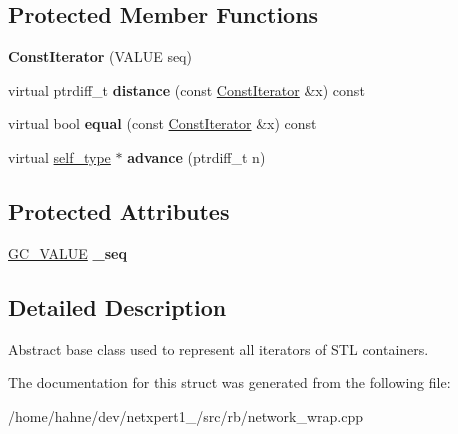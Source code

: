 \subsection*{Protected Member Functions}
\begin{DoxyCompactItemize}
\item 
{\bfseries Const\+Iterator} (V\+A\+L\+UE seq)\hypertarget{structswig_1_1ConstIterator_ae9c2d6b329f8a4b0096871fffa76e260}{}\label{structswig_1_1ConstIterator_ae9c2d6b329f8a4b0096871fffa76e260}

\item 
virtual ptrdiff\+\_\+t {\bfseries distance} (const \hyperlink{structswig_1_1ConstIterator}{Const\+Iterator} \&x) const \hypertarget{structswig_1_1ConstIterator_a34e525a9258ebde3d951bad65e06dc5e}{}\label{structswig_1_1ConstIterator_a34e525a9258ebde3d951bad65e06dc5e}

\item 
virtual bool {\bfseries equal} (const \hyperlink{structswig_1_1ConstIterator}{Const\+Iterator} \&x) const \hypertarget{structswig_1_1ConstIterator_a8d794aa8a430a9cf8d4b80c5e669dfc6}{}\label{structswig_1_1ConstIterator_a8d794aa8a430a9cf8d4b80c5e669dfc6}

\item 
virtual \hyperlink{structswig_1_1ConstIterator}{self\+\_\+type} $\ast$ {\bfseries advance} (ptrdiff\+\_\+t n)\hypertarget{structswig_1_1ConstIterator_a67a09a95ab117e24510bb5fa5f2edb27}{}\label{structswig_1_1ConstIterator_a67a09a95ab117e24510bb5fa5f2edb27}

\end{DoxyCompactItemize}
\subsection*{Protected Attributes}
\begin{DoxyCompactItemize}
\item 
\hyperlink{classswig_1_1GC__VALUE}{G\+C\+\_\+\+V\+A\+L\+UE} {\bfseries \+\_\+seq}\hypertarget{structswig_1_1ConstIterator_a8ce07ddd1137bb8707fc649d6b407c8a}{}\label{structswig_1_1ConstIterator_a8ce07ddd1137bb8707fc649d6b407c8a}

\end{DoxyCompactItemize}


\subsection{Detailed Description}
Abstract base class used to represent all iterators of S\+TL containers. 

The documentation for this struct was generated from the following file\+:\begin{DoxyCompactItemize}
\item 
/home/hahne/dev/netxpert1\+\_/src/rb/network\+\_\+wrap.\+cpp\end{DoxyCompactItemize}
